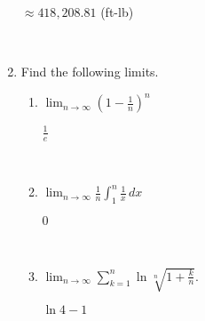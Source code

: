 \documentclass[]{handout}
\begin{document}
\begin{enumerate}[(1)]
\begin{answer} 
		$\approx 418,208.81$ (ft-lb)
\end{answer}

		\

%
%
%
%
%
%
%
%
%
%
%


	\item Find the following limits.

	\begin{enumerate}

		\item $\displaystyle\lim_{n\to\infty} \left( 1 - \frac{1}{n} \right)^n$

\begin{answer} 
		$\displaystyle\frac{1}{e}$
\end{answer}

		\

		\item $\displaystyle\lim_{n\to\infty} \frac{1}{n} \int_1^n \frac{1}{x} \, dx$ %

\begin{answer} 
		$0$
\end{answer}

		\

		\item $\displaystyle\lim_{n\to\infty} \sum_{k=1}^n \ln \sqrt[n]{1 + \frac k n}$.  %

\begin{answer} 
		$\ln 4 - 1$
\end{answer}


\end{enumerate}
\end{enumerate}
\end{document}
